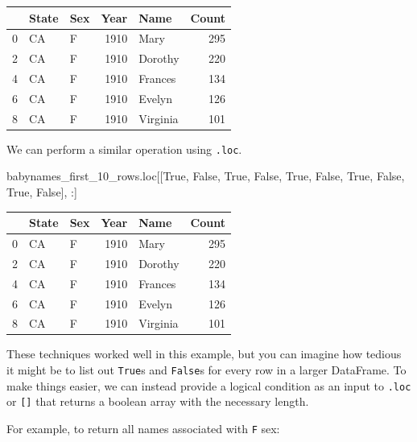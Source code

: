 \documentclass[
  letterpaper,
  DIV=11,
  numbers=noendperiod]{scrreprt}
\newenvironment{Shaded}{\begin{snugshade}}{\end{snugshade}}
\newcommand{\NormalTok}[1]{\textcolor[rgb]{0.00,0.23,0.31}{#1}}
\newcommand{\VariableTok}[1]{\textcolor[rgb]{0.07,0.07,0.07}{#1}}
\begin{document}
\begin{tabular}{lllrlr}
\toprule
{} & State & Sex &  Year &      Name &  Count \\
\midrule
0 &    CA &   F &  1910 &      Mary &    295 \\
2 &    CA &   F &  1910 &   Dorothy &    220 \\
4 &    CA &   F &  1910 &   Frances &    134 \\
6 &    CA &   F &  1910 &    Evelyn &    126 \\
8 &    CA &   F &  1910 &  Virginia &    101 \\
\bottomrule
\end{tabular}

We can perform a similar operation using \texttt{.loc}.

\begin{Shaded}
\begin{Highlighting}[]
\NormalTok{babynames\_first\_10\_rows.loc[[}\VariableTok{True}\NormalTok{, }\VariableTok{False}\NormalTok{, }\VariableTok{True}\NormalTok{, }\VariableTok{False}\NormalTok{, }\VariableTok{True}\NormalTok{, }\VariableTok{False}\NormalTok{, }\VariableTok{True}\NormalTok{, }\VariableTok{False}\NormalTok{, }\VariableTok{True}\NormalTok{, }\VariableTok{False}\NormalTok{], :]}
\end{Highlighting}
\end{Shaded}

\begin{tabular}{lllrlr}
\toprule
{} & State & Sex &  Year &      Name &  Count \\
\midrule
0 &    CA &   F &  1910 &      Mary &    295 \\
2 &    CA &   F &  1910 &   Dorothy &    220 \\
4 &    CA &   F &  1910 &   Frances &    134 \\
6 &    CA &   F &  1910 &    Evelyn &    126 \\
8 &    CA &   F &  1910 &  Virginia &    101 \\
\bottomrule
\end{tabular}

These techniques worked well in this example, but you can imagine how
tedious it might be to list out \texttt{True}s and \texttt{False}s for
every row in a larger DataFrame. To make things easier, we can instead
provide a logical condition as an input to \texttt{.loc} or
\texttt{{[}{]}} that returns a boolean array with the necessary length.

For example, to return all names associated with \texttt{F} sex:
\end{document}
